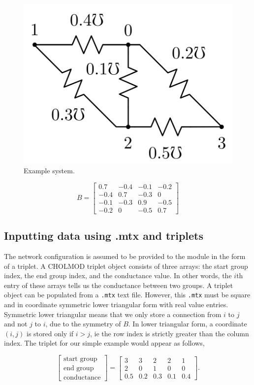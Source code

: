 \documentclass[11pt]{article}
\begin{document}
\begin{figure}[!htbp]
    \centering
    \includegraphics[width=0.33\linewidth]{figures/circuitsimp.png}
    \caption{Example system.}
    \label{fig:3}
\end{figure}

\begin{equation}\label{eq:6}
    B =
    \begin{bmatrix}
    0.7 & -0.4 & -0.1 & -0.2\\
    -0.4 & 0.7 & -0.3 & 0\\
    -0.1 & -0.3 & 0.9 & -0.5\\
    -0.2 & 0 & -0.5 & 0.7
    \end{bmatrix}
\end{equation}

\subsection{Inputting data using .mtx and triplets}
The network configuration is assumed to be provided to the module in the form of a triplet. A CHOLMOD triplet object consists of three arrays: the start group index, the end group index, and the conductance value. In other words, the $i$th entry of these arrays tells us the conductance between two groups. A triplet object can be populated from a \texttt{.mtx} text file. However, this \texttt{.mtx} must be square and in coordinate symmetric lower triangular form with real value entries. Symmetric lower triangular means that we only store a connection from $i$ to $j$ and not $j$ to $i$, due to the symmetry of $B$. In lower triangular form, a coordinate $(i, j)$ is stored only if $i > j$, ie the row index is strictly greater than the column index. The triplet for our simple example would appear as follows,

\begin{equation}
    \begin{bmatrix}
    \text{start group}\\
    \text{end group}\\
    \text{conductance}
    \end{bmatrix}=
    \begin{bmatrix}
    3 & 3 & 2 & 2 & 1\\
    2 & 0 & 1 & 0 & 0\\
    0.5 & 0.2 & 0.3 & 0.1 & 0.4
    \end{bmatrix}.
\end{equation}
\end{document}

